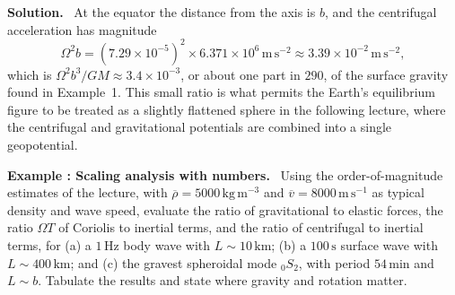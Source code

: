 \documentclass[a4paper,12pt]{paper}
\newcounter{example}
\renewenvironment{example}[1]{%
  \refstepcounter{example}%
  \begin{mdframed}[linewidth=1pt,innertopmargin=6pt,innerbottommargin=6pt]%
  \noindent\textbf{Example \theexample: #1.}\ }{%
  \end{mdframed}}
\newenvironment{solution}{\par\noindent\textbf{Solution.}\ }{\par\medskip}
\begin{document}
\begin{solution}
At the equator the distance from the axis is $b$, and the centrifugal acceleration has magnitude
\begin{equation}
\Omega^{2}b=(7.29\times10^{-5})^{2}\times6.371\times10^{6}\,\mathrm{m\,s^{-2}}\approx3.39\times10^{-2}\,\mathrm{m\,s^{-2}},
\label{eq:21}
\end{equation}
which is $\Omega^{2}b^{3}/GM\approx3.4\times10^{-3}$, or about one part in $290$, of the surface gravity found
in Example~1. This small ratio is what permits the Earth's equilibrium figure to be treated as a
slightly flattened sphere in the following lecture, where the centrifugal and gravitational potentials
are combined into a single geopotential.
\end{solution}

\begin{example}{Scaling analysis with numbers}
Using the order-of-magnitude estimates of the lecture, with $\overline{\rho}=5000\,\mathrm{kg\,m^{-3}}$
and $\overline{v}=8000\,\mathrm{m\,s^{-1}}$ as typical density and wave speed, evaluate the ratio of
gravitational to elastic forces, the ratio $\Omega T$ of Coriolis to inertial terms, and the ratio of
centrifugal to inertial terms, for (a) a $1\,\mathrm{Hz}$ body wave with $L\sim10\,\mathrm{km}$; (b) a
$100\,\mathrm{s}$ surface wave with $L\sim400\,\mathrm{km}$; and (c) the gravest spheroidal mode
$_{0}S_{2}$, with period $54\,\mathrm{min}$ and $L\sim b$. Tabulate the results and state where gravity
and rotation matter.
\end{example}
\end{document}
